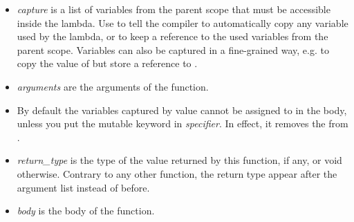 \begin{itemize}
\item {\it capture} is a list of variables from the parent scope that
  must be accessible inside the lambda. Use \code{[=]} to tell the
  compiler to automatically copy any variable used by the lambda, or
  \code{[\&]} to keep a reference to the used variables from the
  parent scope. Variables can also be captured in a fine-grained way,
  e.g. \code{[=a, \&b]} to copy the value of  but store a
  reference to .
\item {\it arguments} are the arguments of the function.
\item By default the variables captured by value cannot be assigned to
  in the body, unless you put the mutable keyword in {\it
    specifier}. In effect, it removes the  from
  .
\item {\it return\_type} is the type of the value returned by this
  function, if any, or void otherwise. Contrary to any other
  function, the return type appear after the argument list instead of
  before.
\item {\it body} is the body of the function.
\end{itemize}

